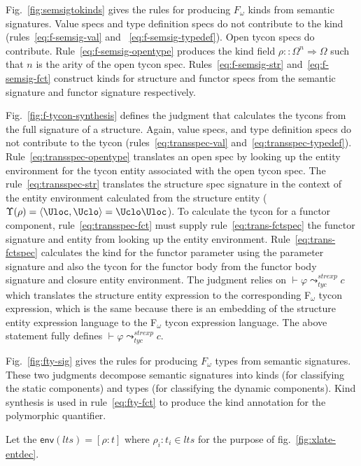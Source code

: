 \documentclass[9pt,nocopyrightspace, fleqn]{sigplanconf}
\begin{document}
Fig.~\ref{fig:semsigtokinds} gives the rules for producing $F_\omega$
kinds from semantic signatures. Value specs and type definition specs
do not contribute to the kind (rules~\ref{eq:f-semsig-val} and~
\ref{eq:f-semsig-typedef}). Open tycon specs do
contribute. Rule~\ref{eq:f-semsig-opentype} produces the kind field
$\rho::\Omega^n \Rightarrow \Omega$ such that $n$ is the arity of the
open tycon spec. Rules~\ref{eq:f-semsig-str} and~\ref{eq:f-semsig-fct}
construct kinds for structure and functor specs from the semantic
signature and functor signature respectively. 

Fig.~\ref{fig:f-tycon-synthesis} defines the judgment that calculates
the tycons from the full signature of a structure. Again, value specs,
and type definition specs do not contribute to the tycon
(rules~\ref{eq:transspec-val} and~\ref{eq:transspec-typedef}).
Rule~\ref{eq:transspec-opentype} translates an open spec by looking up
the entity environment for the tycon entity associated with the open
tycon spec. The rule~\ref{eq:transspec-str} translates the structure
spec signature in the context of the entity environment calculated
from the structure entity
($\Upsilon(\rho)=\langle\Uloc,\Uclo\rangle=\Uclo\Uloc$).  To calculate
the tycon for a functor component, rule~\ref{eq:transspec-fct} must
supply rule~\ref{eq:trans-fctspec} the functor signature and entity
from looking up the entity environment. Rule~\ref{eq:trans-fctspec}
calculates the kind for the functor parameter using the parameter
signature and also the tycon for the functor body from the functor
body signature and closure entity environment. The judgment relies on
$\vdash \varphi \leadsto^{strexp}_{tyc} c$ which translates the
structure entity expression to the corresponding F$_\omega$ tycon
expression, which is the same because there is an embedding of the
structure entity expression language to the F$_\omega$ tycon
expression language. The above statement fully defines $\vdash \varphi
\leadsto^{strexp}_{tyc} c$.

Fig.~\ref{fig:fty-sig} gives the rules
for producing $F_\omega$ types from semantic signatures. These two
judgments decompose semantic signatures into kinds (for classifying
the static components) and types (for classifying the dynamic
components). Kind synthesis is used in rule~\ref{eq:fty-fct} to
produce the kind annotation for the polymorphic quantifier. 

Let the $\mathsf{env}(lts) = [\rho:t]$ where $\rho_i:t_i \in lts$ for
the purpose of fig.~\ref{fig:xlate-entdec}.
\end{document}
